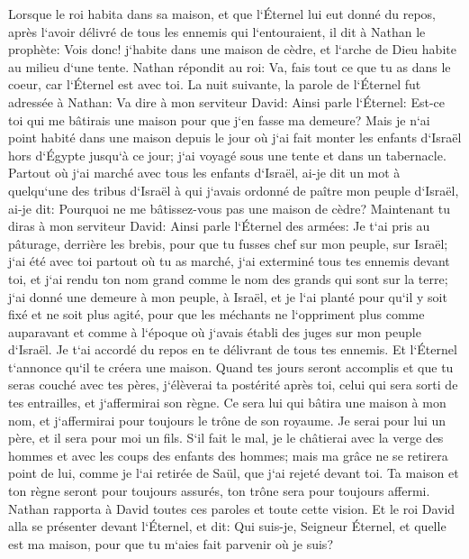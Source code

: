 \verse Lorsque le roi habita dans sa maison, et que l`Éternel lui eut donné du repos, après l`avoir délivré de tous les ennemis qui l`entouraient, 
\verse il dit à Nathan le prophète: Vois donc! j`habite dans une maison de cèdre, et l`arche de Dieu habite au milieu d`une tente. 
\verse Nathan répondit au roi: Va, fais tout ce que tu as dans le coeur, car l`Éternel est avec toi. 
\verse La nuit suivante, la parole de l`Éternel fut adressée à Nathan: 
\verse Va dire à mon serviteur David: Ainsi parle l`Éternel: Est-ce toi qui me bâtirais une maison pour que j`en fasse ma demeure? 
\verse Mais je n`ai point habité dans une maison depuis le jour où j`ai fait monter les enfants d`Israël hors d`Égypte jusqu`à ce jour; j`ai voyagé sous une tente et dans un tabernacle. 
\verse Partout où j`ai marché avec tous les enfants d`Israël, ai-je dit un mot à quelqu`une des tribus d`Israël à qui j`avais ordonné de paître mon peuple d`Israël, ai-je dit: Pourquoi ne me bâtissez-vous pas une maison de cèdre? 
\verse Maintenant tu diras à mon serviteur David: Ainsi parle l`Éternel des armées: Je t`ai pris au pâturage, derrière les brebis, pour que tu fusses chef sur mon peuple, sur Israël; 
\verse j`ai été avec toi partout où tu as marché, j`ai exterminé tous tes ennemis devant toi, et j`ai rendu ton nom grand comme le nom des grands qui sont sur la terre; 
\verse j`ai donné une demeure à mon peuple, à Israël, et je l`ai planté pour qu`il y soit fixé et ne soit plus agité, pour que les méchants ne l`oppriment plus comme auparavant 
\verse et comme à l`époque où j`avais établi des juges sur mon peuple d`Israël. Je t`ai accordé du repos en te délivrant de tous tes ennemis. Et l`Éternel t`annonce qu`il te créera une maison. 
\verse Quand tes jours seront accomplis et que tu seras couché avec tes pères, j`élèverai ta postérité après toi, celui qui sera sorti de tes entrailles, et j`affermirai son règne. 
\verse Ce sera lui qui bâtira une maison à mon nom, et j`affermirai pour toujours le trône de son royaume. 
\verse Je serai pour lui un père, et il sera pour moi un fils. S`il fait le mal, je le châtierai avec la verge des hommes et avec les coups des enfants des hommes; 
\verse mais ma grâce ne se retirera point de lui, comme je l`ai retirée de Saül, que j`ai rejeté devant toi. 
\verse Ta maison et ton règne seront pour toujours assurés, ton trône sera pour toujours affermi. 
\verse Nathan rapporta à David toutes ces paroles et toute cette vision. 
\verse Et le roi David alla se présenter devant l`Éternel, et dit: Qui suis-je, Seigneur Éternel, et quelle est ma maison, pour que tu m`aies fait parvenir où je suis? 
